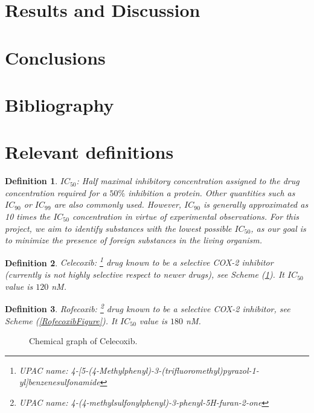 \documentclass[11pt]{article}
\newtheorem{definition}{Definition}
\begin{document}
\section{Results and Discussion}

\newpage

\section{Conclusions}
\newpage

\section{Bibliography}
\printbibliography[title = { \vspace{-1cm}}]
\newpage

\appendix
\section{Relevant definitions}
\begin{definition}\label{definitionIC50}
$IC_{50}$: Half maximal inhibitory concentration assigned to the drug concentration required for a $50\%$ inhibition a protein. Other quantities such as $IC_{90}$ or $IC_{99}$ are also commonly used. However, $IC_{90}$ is generally approximated as 10 times the $IC_{50}$ concentration in virtue of experimental observations\cite{BookIC50}. For this project, we aim to identify substances with the lowest possible $IC_{50}$, as our goal is to minimize the presence of foreign substances in the living organism.
\end{definition}

\begin{definition}\label{definitionCelecoxib}
Celecoxib: \footnote{UPAC name: 4-[5-(4-Methylphenyl)-3-(trifluoromethyl)pyrazol-1-yl]benzenesulfonamide} drug known to be a selective COX-2 inhibitor (currently is not \emph{highly selective} respect to newer drugs), see Scheme (\ref{CelecoxibFigure}). It $IC_{50}$ value is $120$ nM.
\end{definition}

\begin{definition}\label{definitionRofecoxib}
Rofecoxib: \footnote{UPAC name: 4-(4-methylsulfonylphenyl)-3-phenyl-5H-furan-2-one} drug known to be a selective COX-2 inhibitor, see Scheme (\ref{RofecoxibFigure}). It $IC_{50}$ value is $180$ nM.
\end{definition}

\begin{figure}[H]
\captionsetup{type=scheme}
\centering
{}
\caption{Chemical graph of Celecoxib.}
\label{CelecoxibFigure}
\end{figure}
\end{document}
